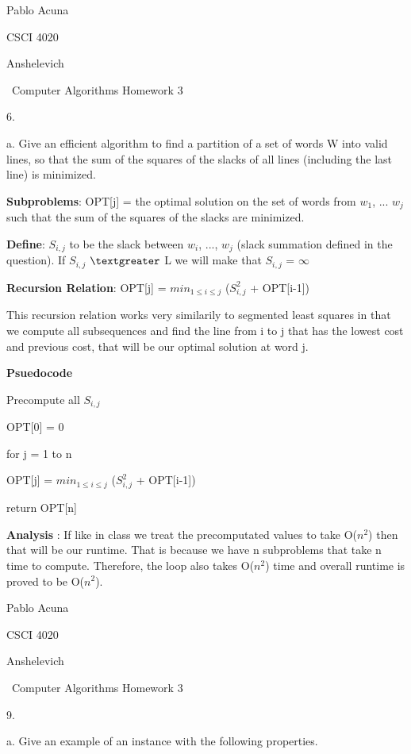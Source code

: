 \documentclass{article}
\begin{document}
Pablo Acuna

CSCI 4020

Anshelevich

{\centering\ Computer Algorithms Homework 3 \par}



6.

\indent \indent a. Give an efficient algorithm to find a partition of a
set of words W into valid lines, so that the sum of the squares of the
slacks of all lines (including the last line) is minimized. \newline

\textbf{Subproblems}: OPT[j] = the optimal solution on the set of words from $w_{1}$, ...
$w_{j}$ such that the sum of the squares of the slacks are minimized.

\textbf{Define}: $S_{i,j}$ to be the slack between $w_{i}$, ..., $w_{j}$ (slack summation
defined in the question).  If $S_{i,j}$ $\textgreater$ L we will make that
$S_{i,j}$ = $\infty$

\textbf{Recursion Relation}: OPT[j] = $min_{1 \leq i \leq j}$ ($S_{i,j}^2$
+ OPT[i-1])

This recursion relation works very similarily to segmented least squares in that
we compute all subsequences and find the line from i to j that has the lowest
cost and previous cost, that will be our optimal solution at word j.

\textbf{Psuedocode}

Precompute all $S_{i,j}$

OPT[0] = 0

for j = 1 to n

\indent \indent OPT[j] = $min_{1 \leq i \leq j}$ ($S_{i,j}^2$ + OPT[i-1])

return OPT[n]

\textbf{Analysis} : If like in class we treat the precomputated values to take
O($n^2$) then that will be our runtime.  That is because we have n subproblems
that take n time to compute.  Therefore, the loop also takes O($n^2$) time and
overall runtime is proved to be O($n^2$).
\clearpage

Pablo Acuna

CSCI 4020

Anshelevich

{\centering\ Computer Algorithms Homework 3 \par}

9.

\indent \indent a. Give an example of an instance with the following
properties.
\end{document}
